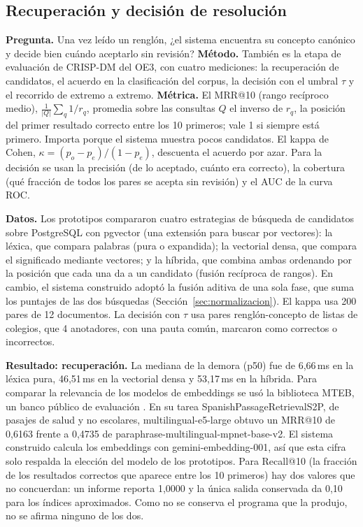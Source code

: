 \subsection{Recuperación y decisión de resolución}
\label{sec:recuperacion}

\textbf{Pregunta.} Una vez leído un renglón, ¿el sistema encuentra su concepto canónico y decide
bien cuándo aceptarlo sin revisión? \textbf{Método.} También es la etapa de evaluación de CRISP-DM
del OE3, con cuatro mediciones: la recuperación de candidatos, el acuerdo en la clasificación del
corpus, la decisión con el umbral $\tau$ y el recorrido de extremo a extremo.
\textbf{Métrica.} El MRR@10 (rango recíproco medio), $\frac{1}{|Q|}\sum_q 1/r_q$, promedia sobre las
consultas $Q$ el inverso de $r_q$, la posición del primer resultado correcto entre los 10 primeros; vale
1 si siempre está primero. Importa porque el sistema muestra pocos candidatos. El kappa de Cohen,
$\kappa=(p_o-p_e)/(1-p_e)$, descuenta el acuerdo por azar. Para la decisión se usan la precisión (de lo
aceptado, cuánto era correcto), la cobertura (qué fracción de todos los pares se acepta sin revisión) y
el AUC de la curva ROC.

\textbf{Datos.} Los prototipos compararon cuatro estrategias de búsqueda de candidatos sobre PostgreSQL
con pgvector (una extensión para buscar por vectores): la léxica, que compara palabras (pura o
expandida); la vectorial densa, que compara el significado mediante vectores; y la híbrida, que combina
ambas ordenando por la posición que cada una da a un candidato (fusión recíproca de rangos). En cambio,
el sistema construido adoptó la fusión aditiva de una sola fase, que suma los puntajes de las dos
búsquedas (Sección~\ref{sec:normalizacion}). El kappa usa 200 pares de 12 documentos. La decisión con
$\tau$ usa \calTauPares{} pares renglón-concepto de \calTauListas{} listas de \calTauColegios{} colegios,
que 4 anotadores, con una pauta común, marcaron como correctos o incorrectos.

\textbf{Resultado: recuperación.} La mediana de la demora (p50) fue de 6,66\,ms en la léxica pura,
46,51\,ms en la vectorial densa y 53,17\,ms en la híbrida. Para comparar
la relevancia de los modelos de embeddings se usó la biblioteca MTEB, un banco público de evaluación
\citep{muennighoff_mteb_2023}. En su tarea SpanishPassageRetrievalS2P, de pasajes de
salud y no escolares, multilingual-e5-large obtuvo un MRR@10 de 0,6163 frente a 0,4735 de
paraphrase-multilingual-mpnet-base-v2. El sistema construido calcula los embeddings con
gemini-embedding-001, así que esta cifra solo respalda la elección del modelo de los prototipos. Para
Recall@10 (la fracción de los resultados correctos que aparece entre los 10 primeros) hay dos valores que
no concuerdan: un informe reporta 1,0000 y la única salida conservada da 0,10 para los índices
aproximados. Como no se conserva el programa que la produjo, no se afirma ninguno de los dos.

